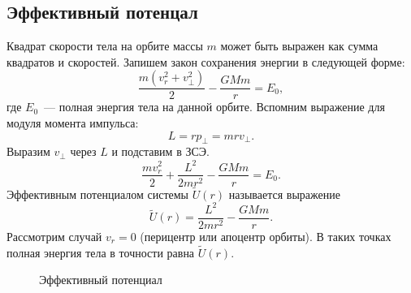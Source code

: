 \subsection{Эффективный потенцал}

Квадрат скорости тела на орбите массы $m$ может быть выражен как сумма квадратов  и  скоростей. Запишем закон сохранения энергии в следующей форме:
\begin{equation*}
	\frac{m(v^2_r + v^2_{\perp})}{2} - \frac{GMm}{r} = E_0,
\end{equation*}
где $E_0$~--- полная энергия тела на данной орбите. Вспомним выражение для модуля момента импульса:
\begin{equation}
	L = r p_{\perp} = mr v_{\perp}.
\end{equation}
Выразим $v_{\perp}$ через $L$ и подставим в ЗСЭ.
\begin{equation}
	\frac{m v^2_r}{2} + \frac{L^2}{2mr^2} - \frac{GMm}{r} = E_0.
\end{equation}
Эффективным потенциалом системы $\tilde{U}(r)$ называется выражение
\begin{equation}
	\tilde{U}(r) = \frac{L^2}{2mr^2} - \frac{GMm}{r}.
\end{equation}
Рассмотрим случай $v_r=0$ (перицентр или апоцентр орбиты). В таких точках полная энергия тела в точности равна $\tilde{U}(r)$.

\begin{wrapfigure}[10]{r}{0.47\tw}
    \centering
    \caption{Эффективный потенциал}
    \label{effitient-potential-plot}
\end{wrapfigure} 

